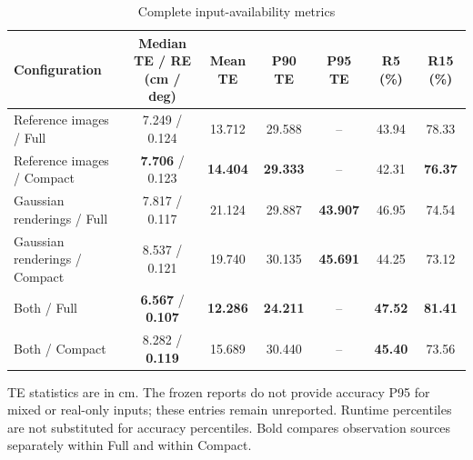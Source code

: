 \begin{table}[tp]
\centering
\footnotesize
\setlength{\tabcolsep}{4pt}
\renewcommand{\arraystretch}{1.12}
\caption{Complete input-availability metrics}
\label{tab:s_input_tails}
\begin{tabular}{lcccccc}
\toprule
Configuration & \shortstack{Median TE / RE\\(cm / deg)} & Mean TE & P90 TE & P95 TE & R5 (\%) & R15 (\%) \\
\midrule
Reference images / Full & 7.249 / 0.124 & 13.712 & 29.588 & -- & 43.94 & 78.33 \\
Reference images / Compact & \textbf{7.706} / 0.123 & \textbf{14.404} & \textbf{29.333} & -- & 42.31 & \textbf{76.37} \\
Gaussian renderings / Full & 7.817 / 0.117 & 21.124 & 29.887 & \textbf{43.907} & 46.95 & 74.54 \\
Gaussian renderings / Compact & 8.537 / 0.121 & 19.740 & 30.135 & \textbf{45.691} & 44.25 & 73.12 \\
Both / Full & \textbf{6.567} / \textbf{0.107} & \textbf{12.286} & \textbf{24.211} & -- & \textbf{47.52} & \textbf{81.41} \\
Both / Compact & 8.282 / \textbf{0.119} & 15.689 & 30.440 & -- & \textbf{45.40} & 73.56 \\
\bottomrule
\end{tabular}
\par\smallskip\begin{minipage}{0.98\linewidth}\footnotesize TE statistics are in cm. The frozen reports do not provide accuracy P95 for mixed or real-only inputs; these entries remain unreported. Runtime percentiles are not substituted for accuracy percentiles. Bold compares observation sources separately within Full and within Compact.\end{minipage}
\end{table}
